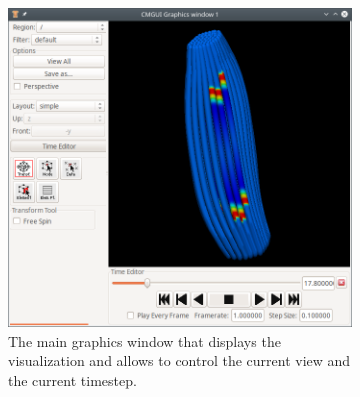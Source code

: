 \begin{figure}%
  \centering%
  \begin{subfigure}[t]{0.62\textwidth}%
    \centering%
    \includegraphics[width=\textwidth]{images/implementation/cmgui_graphics1.png}
    \caption{The main graphics window that displays the visualization and allows to control the current view and the current timestep.}%
    \label{fig:current_configuration_1}%
  \end{subfigure}
  \begin{subfigure}[t]{0.363\textwidth}%
    \centering%

\end{subfigure}
\end{figure}

